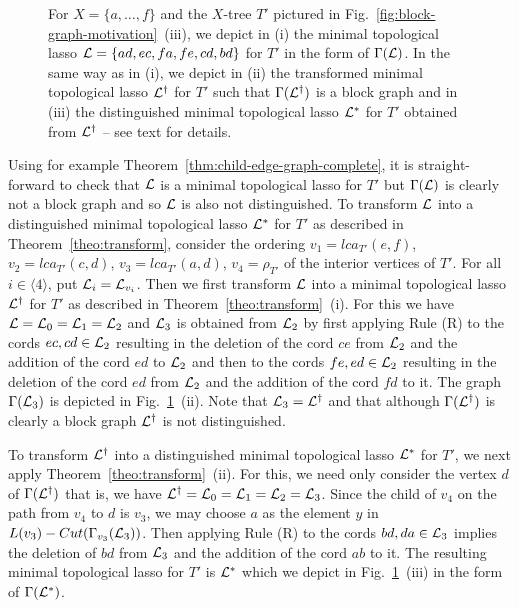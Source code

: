 \begin{figure}
  \begin{center}
    
  \end{center}
  \caption{ For $X=\{a,\ldots, f\}$ and the $X$-tree $T'$ pictured in
    Fig.~\ref{fig:block-graph-motivation}~(iii), we depict in (i) the minimal
    topological lasso ${\mathcal L}=\{ad,ec,fa,fe,cd,bd\}$ for $T'$ in the form of
    $\Gamma({\mathcal L})$.  In the same way as in (i), we depict in (ii) the
    transformed minimal topological lasso ${\mathcal L}^{\dagger}$ for $T'$ such that
    $\Gamma({\mathcal L}^{\dagger})$ is a block graph and in (iii) the distinguished
    minimal topological lasso ${\mathcal L}^*$ for $T'$ obtained from ${\mathcal L}^{\dagger}$
    -- see text for details.}
  \label{fig:transformation}
\end{figure}
%
Using for example Theorem~\ref{thm:child-edge-graph-complete}, it is
straight-forward to check that ${\mathcal L}$ is a minimal topological lasso for $T'$
but $\Gamma({\mathcal L})$ is clearly not a block graph and so ${\mathcal L}$ is also not
distinguished. To transform ${\mathcal L}$ into a distinguished minimal topological
lasso ${\mathcal L}^*$ for $T'$ as described in Theorem~\ref{theo:transform}, consider
the ordering $v_1=lca_{T'}(e,f)$, $v_2=lca_{T'}(c,d)$, $v_3=lca_{T'}(a,d)$,
$v_4=\rho_{T'}$ of the interior vertices of $T'$. For all $i\in\langle
4\rangle$, put ${\mathcal L}_i={\mathcal L}_{v_i}$. Then we first transform ${\mathcal L}$ into a minimal
topological lasso ${\mathcal L}^{\dagger}$ for $T'$ as described in
Theorem~\ref{theo:transform}~(i). For this we have ${\mathcal L}={\mathcal L}_0={\mathcal L}_1={\mathcal L}_2$ and
${\mathcal L}_3$ is obtained from ${\mathcal L}_2$ by first applying Rule (R) to the cords $ec,
cd \in {\mathcal L}_2$ resulting in the deletion of the cord $ce$ from ${\mathcal L}_2 $ and the
addition of the cord $ed$ to ${\mathcal L}_2$ and then to the cords $fe,ed\in{\mathcal L}_2$
resulting in the deletion of the cord $ed$ from ${\mathcal L}_2$ and the addition of
the cord $fd$ to it. The graph $\Gamma({\mathcal L}_3)$ is depicted in
Fig.~\ref{fig:transformation}~(ii).  Note that ${\mathcal L}_3={\mathcal L}^{\dagger}$ and that
although $\Gamma({\mathcal L}^{\dagger})$ is clearly a block graph ${\mathcal L}^{\dagger}$ is
not distinguished.

To transform ${\mathcal L}^{\dagger}$ into a distinguished minimal topological lasso
${\mathcal L}^*$ for $T'$, we next apply Theorem~\ref{theo:transform}~(ii). For this, we
need only consider the vertex $d$ of $\Gamma({\mathcal L}^{\dagger})$ that is, we have
${\mathcal L}^{\dagger}={\mathcal L}_0={\mathcal L}_1={\mathcal L}_2={\mathcal L}_3$.  Since the child of $v_4$ on the path
from $v_4$ to $d$ is $v_3$, we may choose $a$ as the element $y$ in
$L(v_3)-Cut(\Gamma_{v_3}({\mathcal L}_3))$. Then applying Rule (R) to the cords
$bd,da\in {\mathcal L}_3$ implies the deletion of $bd$ from ${\mathcal L}_3$ and the addition of
the cord $ab$ to it. The resulting minimal topological lasso for $T'$ is
${\mathcal L}^*$ which we depict in Fig.~\ref{fig:transformation}~(iii) in the form of
$\Gamma({\mathcal L}^*)$.
 
